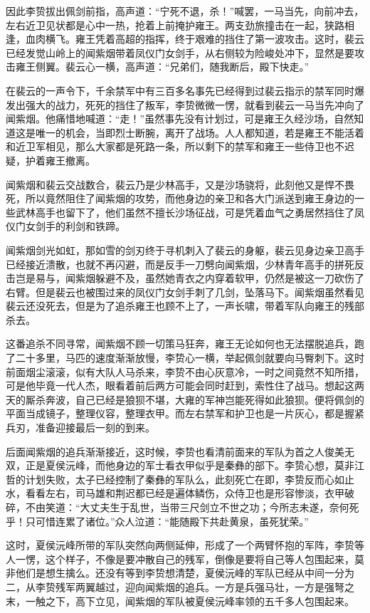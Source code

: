 因此李贽拔出佩剑前指，高声道：“宁死不退，杀！”喊罢，一马当先，向前冲去，左右近卫见状都是心中一热，抢着上前掩护雍王。两支劲旅撞击在一起，狭路相逢，血肉横飞。雍王凭着高超的指挥，终于艰难的挡住了第一波攻击。这时，裴云已经发觉山岭上的闻紫烟带着凤仪门女剑手，从右侧较为险峻处冲下，显然是要攻击雍王侧翼。裴云心一横，高声道：“兄弟们，随我断后，殿下快走。”

在裴云的一声令下，千余禁军中有三百多名事先已经得到过裴云指示的禁军同时爆发出强大的战力，死死的挡住了叛军，李贽微微一愣，就看到裴云一马当先冲向了闻紫烟。他痛惜地喊道：“走！”虽然事先没有计划过，可是雍王久经沙场，自然知道这是唯一的机会，当即烈士断腕，离开了战场。人人都知道，若是雍王不能活着和近卫军相见，那么大家都是死路一条，所以剩下的禁军和雍王一些侍卫也不迟疑，护着雍王撤离。

闻紫烟和裴云交战数合，裴云乃是少林高手，又是沙场骁将，此刻他又是悍不畏死，所以竟然阻住了闻紫烟的攻势，而他身边的亲卫和各大门派送到雍王身边的一些武林高手也留下了，他们虽然不擅长沙场征战，可是凭着血气之勇居然挡住了凤仪门女剑手的利剑和铁蹄。

闻紫烟剑光如虹，那如雪的剑刃终于寻机刺入了裴云的身躯，裴云见身边亲卫高手已经接近溃散，也就不再闪避，而是反手一刀劈向闻紫烟，少林青年高手的拼死反击岂是易与，闻紫烟躲避不及，虽然她青衣之内穿着软甲，仍然是被这一刀砍伤了右臂。但是裴云也被围过来的凤仪门女剑手刺了几剑，坠落马下。闻紫烟虽然看见裴云还没死去，但是为了追杀雍王也顾不上了，一声长啸，带着军队向雍王的残部杀去。

这番追杀不同寻常，闻紫烟不顾一切策马狂奔，雍王无论如何也无法摆脱追兵，跑了二十多里，马匹的速度渐渐放慢，李贽心一横，举起佩剑就要向马臀刺下。这时前面烟尘滚滚，似有大队人马杀来，李贽不由心灰意冷，一时之间竟然不知所措，可是他毕竟一代人杰，眼看着前后两方可能会同时赶到，索性住了战马。想起这两天的厮杀奔波，自己已经是狼狈不堪，大雍的军神岂能死得如此狼狈。便将佩剑的平面当成镜子，整理仪容，整理衣甲。而左右禁军和护卫也是一片灰心，都是握紧兵刃，准备迎接最后一刻的到来。

后面闻紫烟的追兵渐渐接近，这时候，李贽也看清前面来的军队为首之人俊美无双，正是夏侯沅峰，而他身边的军士看衣甲似乎是秦彝的部下。李贽心想，莫非江哲的计划失败，太子已经控制了秦彝的军队么，此刻死亡在即，李贽反而心如止水，看看左右，司马雄和荆迟都已经是遍体鳞伤，众侍卫也是形容惨淡，衣甲破碎，不由笑道：“大丈夫生于乱世，当带三尺剑立不世之功；今所志未遂，奈何死乎！只可惜连累了诸位。”众人泣道：“能随殿下共赴黄泉，虽死犹荣。”

这时，夏侯沅峰所带的军队突然向两侧延伸，形成了一个两臂怀抱的军阵，李贽等人一愣，这个样子，不像是要冲散自己的残军，倒像是要将自己等人包围起来，莫非他们是想生擒么。还没有等到李贽想清楚，夏侯沅峰的军队已经从中间一分为二，从李贽残军两翼越过，迎向闻紫烟的追兵。一方是兵强马壮，一方是强弩之末，一触之下，高下立见，闻紫烟的军队被夏侯沅峰率领的五千多人包围起来。

